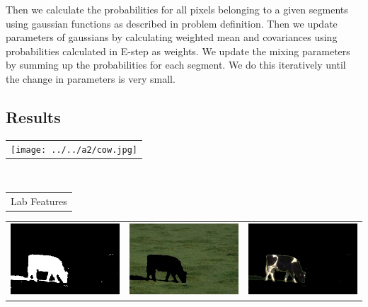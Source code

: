 \documentclass{article}
\begin{document}
Then we calculate the probabilities for all pixels belonging to a given segments using gaussian functions as described in problem definition. Then we update parameters of gaussians by calculating weighted mean and covariances using probabilities calculated in E-step as weights. We update the mixing parameters by summing up the probabilities for each segment. We do this iteratively until the change in parameters is very small.

\subsection{Results}

\begin{center}
\begin{tabular}{c}
\texttt{[image: ../../a2/cow.jpg]}
\end{tabular}
\\
\begin{tabular}{c}

Lab Features \\
\end{tabular}
 \begin{tabular}{c c c} 

 \includegraphics[width=.4\linewidth]{../image-segmentation/output/Lab/cow_mask.jpg} & 
 
 \includegraphics[width=.4\linewidth]{../image-segmentation/output/Lab/cow_seg1.jpg} & \includegraphics[width=.4\linewidth]{../image-segmentation/output/Lab/cow_seg2.jpg} \\
  

\end{tabular}
\end{center}
\end{document}
